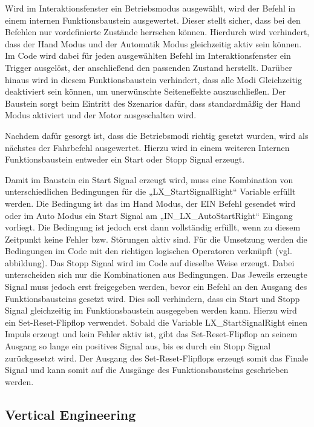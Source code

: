Wird im Interaktionsfenster ein Betriebsmodus ausgewählt, wird der Befehl in einem internen Funktionsbaustein ausgewertet. Dieser stellt sicher, dass bei den Befehlen nur vordefinierte Zustände herrschen können. Hierdurch wird verhindert, dass der Hand Modus und der Automatik Modus gleichzeitig aktiv sein können. Im Code wird dabei für jeden ausgewählten Befehl im Interaktionsfenster ein Trigger ausgelöst, der anschließend den passenden Zustand herstellt. Darüber hinaus wird in diesem Funktionsbaustein verhindert, dass alle Modi Gleichzeitig deaktiviert sein können, um unerwünschte Seiteneffekte auszuschließen. Der Baustein sorgt beim Eintritt des Szenarios dafür, dass standardmäßig der Hand Modus aktiviert und der Motor ausgeschalten wird. 

Nachdem dafür gesorgt ist, dass die Betriebsmodi richtig gesetzt wurden, wird als nächstes der Fahrbefehl ausgewertet. Hierzu wird in einem weiteren Internen Funktionsbaustein entweder ein Start oder Stopp Signal erzeugt. 

Damit im Baustein ein Start Signal erzeugt wird, muss eine Kombination von unterschiedlichen Bedingungen für die „LX_StartSignalRight“ Variable erfüllt werden. Die Bedingung ist das im Hand Modus, der EIN Befehl gesendet wird oder im Auto Modus ein Start Signal am „IN_LX_AutoStartRight“ Eingang vorliegt. Die Bedingung ist jedoch erst dann vollständig erfüllt, wenn zu diesem Zeitpunkt keine Fehler bzw. Störungen aktiv sind. Für die Umsetzung werden die Bedingungen im Code mit den richtigen logischen Operatoren verknüpft (vgl. abbildung). Das Stopp Signal wird im Code auf dieselbe Weise erzeugt. Dabei unterscheiden sich nur die Kombinationen aus Bedingungen.
Das Jeweils erzeugte Signal muss jedoch erst freigegeben werden, bevor ein Befehl an den Ausgang des Funktionsbausteins gesetzt wird. Dies soll verhindern, dass ein Start und Stopp Signal gleichzeitig im Funktionsbaustein ausgegeben werden kann. Hierzu wird ein Set-Reset-Flipflop verwendet. Sobald die Variable LX_StartSignalRight einen Impuls erzeugt und kein Fehler aktiv ist, gibt das Set-Reset-Flipflop an seinem Ausgang so lange ein positives Signal aus, bis es durch ein Stopp Signal zurückgesetzt wird. Der Ausgang des Set-Reset-Flipflops erzeugt somit das Finale Signal und kann somit auf die Ausgänge des Funktionsbausteins geschrieben werden.


\subsection{Vertical Engineering}


